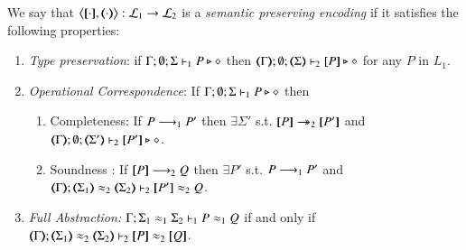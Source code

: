 
\begin{definition}\rm
	\label{def:ep}
	We say that $\enc{\cdot}{\cdot} : \tyl{L}_1 \to \tyl{L}_2$ is a \emph{semantic preserving encoding}
	if it satisfies the following properties:
	
	\begin{enumerate}[1.]
		\item \emph{Type preservation}:	%
		if
			$\Gamma; \emptyset; \Sigma \vdash_1 P \triangleright \diamond$ then $\mapt{\Gamma}; \emptyset; \mapt{\Sigma} \proves_2 \map{P} \hastype \Proc$ for any   $P$ in $L_1$.

		\item \emph{Operational Correspondence}: If $\Gamma; \emptyset; \Sigma \vdash_1 P \triangleright \diamond$ then
		\begin{enumerate}[-]
			\item	Completeness: If $P \longrightarrow_1 P'$ then $\exists \Sigma'$ s.t.
				$\map{P} \Red_2 \map{P'}$ and
				$\mapt{\Gamma}; \emptyset; \mapt{\Sigma'} \proves_2 \map{P'} \hastype \Proc$.
			\item Soundness : If $[\!\![P]\!\!] \longrightarrow_2 Q$ then
				$\exists P'$ s.t. $P \longrightarrow_1 P'$ and \\
				$\mapt{\Gamma}; \mapt{\Sigma_1} \wb_2 \mapt{\Sigma_2} \proves_2 \map{P'} \wb_2 Q$.
		\end{enumerate}
		
		\item \emph{Full Abstraction:}
		$\Gamma; \Sigma_1 \approx_1 \Sigma_2 \vdash_1 P \approx_1 Q $ if and only if $\mapt{\Gamma}; \mapt{\Sigma_1} \wb_2 \mapt{\Sigma_2} \proves_2 \map{P} \wb_2 \map{Q} $.
	\end{enumerate}
\end{definition}


